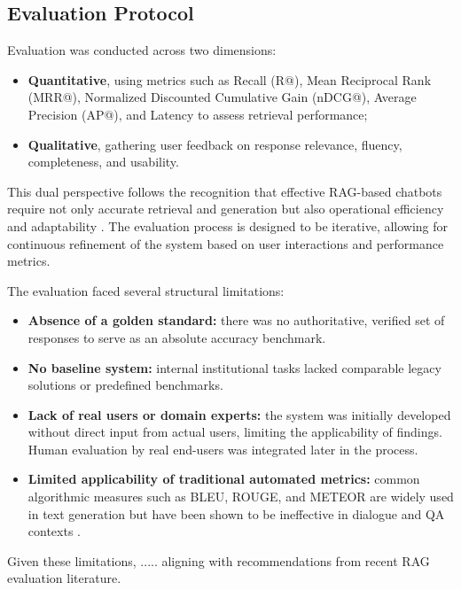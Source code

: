 \begin{spacing}{1.5}
\section{Evaluation Protocol}\label{sec:evaluation_protocol}
Evaluation was conducted across two dimensions: 
\begin{itemize}
      \item \textbf{Quantitative}, using metrics such as Recall (R@), Mean Reciprocal Rank (MRR@), Normalized Discounted Cumulative Gain (nDCG@), Average Precision (AP@), and Latency to assess retrieval performance;
      \item \textbf{Qualitative}, gathering user feedback on response relevance, fluency, completeness, and usability.
\end{itemize}

This dual perspective follows the recognition that effective RAG-based chatbots require not only accurate retrieval and generation but also operational efficiency and adaptability \citep{akkiraju_facts_2024}. The evaluation process is designed to be iterative, allowing for continuous refinement of the system based on user interactions and performance metrics.

The evaluation faced several structural limitations:
\begin{itemize}
      \item \textbf{Absence of a golden standard:} there was no authoritative, verified set of responses to serve as an absolute accuracy benchmark.
      \item \textbf{No baseline system:} internal institutional tasks lacked comparable legacy solutions or predefined benchmarks.
      \item \textbf{Lack of real users or domain experts:} the system was initially developed without direct input from actual users, limiting the applicability of findings. Human evaluation by real end-users was integrated later in the process.
      \item \textbf{Limited applicability of traditional automated metrics:} common algorithmic measures such as BLEU, ROUGE, and METEOR are widely used in text generation but have been shown to be ineffective in dialogue and QA contexts \citep{deriu_survey_2020,liu_how_2016}.
\end{itemize}

Given these limitations, ..... aligning with recommendations from recent RAG evaluation literature.



\end{spacing}
